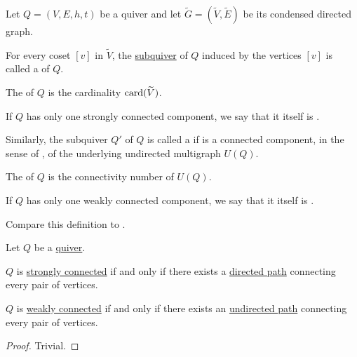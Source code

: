 \begin{definition}\label{def:quiver_connectedness}
  Let \( Q = (V, E, h, t) \) be a quiver and let \( \widetilde{G} = (\widetilde{V}, \widetilde{E}) \) be its condensed directed graph.

  \begin{thmenum}
     For every coset \( [v] \) in \( \widetilde{V} \), the \hyperref[def:hypergraph/submodel]{subquiver} of \( Q \) induced by the vertices \( [v] \) is called a  of \( Q \).

    The  of \( Q \) is the cardinality \( \operatorname{card}(\widetilde{V}) \).

    If \( Q \) has only one strongly connected component, we say that it itself is .

     Similarly, the subquiver \( Q' \) of \( Q \) is called a  if is a connected component, in the sense of , of the underlying undirected multigraph \( U(Q) \).

    The  of \( Q \) is the connectivity number of \( U(Q) \).

    If \( Q \) has only one weakly connected component, we say that it itself is .
  \end{thmenum}

  Compare this definition to .
\end{definition}

\begin{proposition}\label{thm:quiver_connectedness_via_chains}
  Let \( Q \) be a \hyperref[def:quiver]{quiver}.

  \begin{thmenum}
     \( Q \) is \hyperref[def:quiver_connectedness/strong]{strongly connected} if and only if there exists a \hyperref[def:quiver_path/directed]{directed path} connecting every pair of vertices.

     \( Q \) is \hyperref[def:quiver_connectedness/weak]{weakly connected} if and only if there exists an \hyperref[def:quiver_path/undirected]{undirected path} connecting every pair of vertices.
  \end{thmenum}
\end{proposition}
\begin{proof}
  Trivial.
\end{proof}

